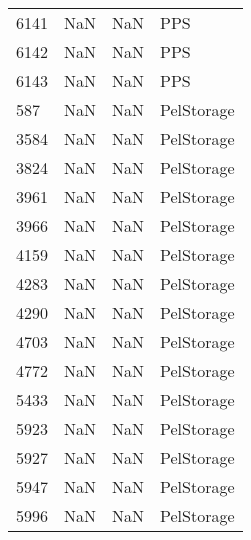\begin{tabular}{llll}
6141 &                   NaN &                        NaN &                                       PPS \\
6142 &                   NaN &                        NaN &                                       PPS \\
6143 &                   NaN &                        NaN &                                       PPS \\
587  &                   NaN &                        NaN &                                PelStorage \\
3584 &                   NaN &                        NaN &                                PelStorage \\
3824 &                   NaN &                        NaN &                                PelStorage \\
3961 &                   NaN &                        NaN &                                PelStorage \\
3966 &                   NaN &                        NaN &                                PelStorage \\
4159 &                   NaN &                        NaN &                                PelStorage \\
4283 &                   NaN &                        NaN &                                PelStorage \\
4290 &                   NaN &                        NaN &                                PelStorage \\
4703 &                   NaN &                        NaN &                                PelStorage \\
4772 &                   NaN &                        NaN &                                PelStorage \\
5433 &                   NaN &                        NaN &                                PelStorage \\
5923 &                   NaN &                        NaN &                                PelStorage \\
5927 &                   NaN &                        NaN &                                PelStorage \\
5947 &                   NaN &                        NaN &                                PelStorage \\
5996 &                   NaN &                        NaN &                                PelStorage \\

\end{tabular}
